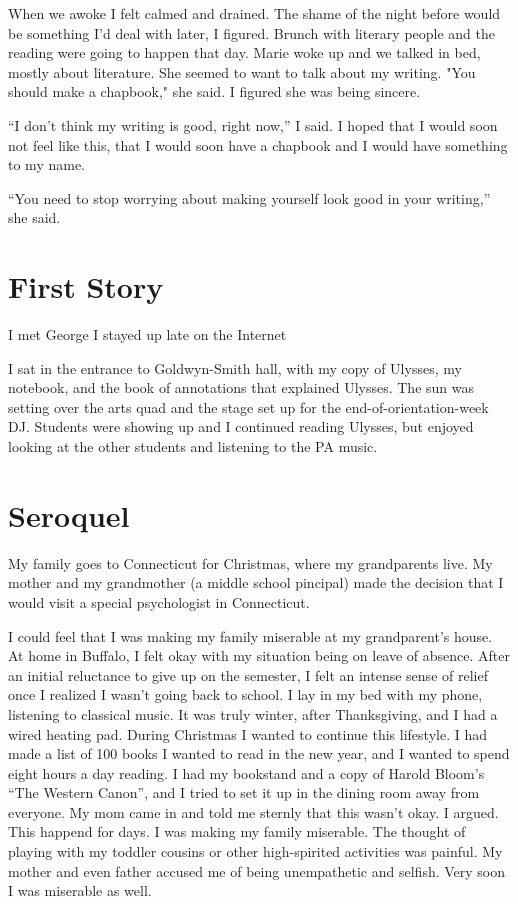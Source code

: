 \documentclass[12pt]{article}
\begin{document}
When we awoke I felt calmed and drained.  The shame of the night before would be
something I'd deal with later, I figured.  Brunch with literary people and the
reading were going to happen that day.  Marie woke up and we talked in bed,
mostly about literature.  She seemed to want to talk about my writing.  "You
should make a chapbook," she said.  I figured she was being sincere.  

``I don't think my writing is good, right now,'' I said.  I hoped that I would
soon not feel like this, that I would soon have a chapbook and I would have
something to my name.

``You need to stop worrying about making yourself look good in your writing,'' she
said.

\section{First Story}
I met George
I stayed up late on the Internet

I sat in the entrance to Goldwyn-Smith hall, with my copy of Ulysses, my
notebook, and the book of annotations that explained Ulysses.  The sun was
setting over the arts quad and the stage set up for the end-of-orientation-week
DJ.  Students were showing up and I continued reading Ulysses, but enjoyed
looking at the other students and listening to the PA music.

\section{Seroquel}
My family goes to Connecticut for Christmas, where my grandparents live.  My
mother and my grandmother (a middle school pincipal) made the decision that I
would visit a special psychologist in Connecticut.

I could feel that I was making my family miserable at my grandparent's house.
At home in Buffalo, I felt okay with my situation being on leave of absence.
After an initial reluctance to give up on the semester, I felt an intense sense
of relief once I realized I wasn't going back to school.  I lay in my bed with my
phone, listening to classical music.  It was truly winter, after Thanksgiving,
and I had a wired heating pad.  During Christmas I wanted to continue this
lifestyle.  I had made a list of 100 books I wanted to read in the new year,
and I wanted to spend eight hours a day reading.  I had my bookstand and a copy
of Harold Bloom's ``The Western Canon'', and I tried to set it up in the dining
room away from everyone.  My mom came in and told me sternly that this wasn't
okay.  I argued.  This happend for days.  I was making my family miserable.  The
thought of playing with my toddler cousins or other high-spirited activities was
painful.  My mother and even father accused me of being unempathetic and
selfish.  Very soon I was miserable as well.
\end{document}
